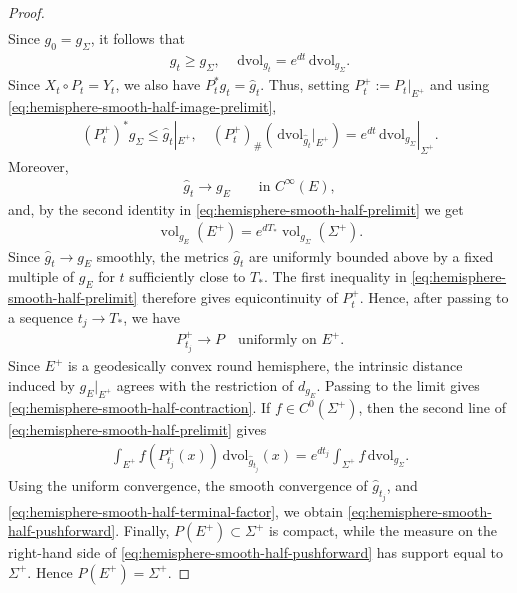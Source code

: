 \documentclass[11pt,reqno]{amsart}
\numberwithin{equation}{section}
\theoremstyle{definition}
\theoremstyle{remark}
\newcommand{\0}{\emptyset}
\newcommand{\vol}{\operatorname{vol}}
\newcommand{\dvol}{\,\mathrm{dvol}}
\begin{document}
\begin{proof}
\begin{align}
\end{align}
Since $g_0=g_\Sigma$, it follows that
\begin{align}\label{eq:hemisphere-smooth-metric-volume-consequences}
        g_t\geq g_\Sigma,
        \quad
        \dvol_{g_t}
        =
        e^{dt}\dvol_{g_\Sigma}.
\end{align}
Since $X_t\circ P_t=Y_t$, we also have $P_t^*g_t=\widehat g_t$. Thus, setting $P_t^+:=P_t|_{E^+}$ and using
\eqref{eq:hemisphere-smooth-half-image-prelimit},
\begin{align}\label{eq:hemisphere-smooth-half-prelimit}
        (P_t^+)^*g_\Sigma
        \leq
        \widehat g_t|_{E^+},
        \quad 
        (P_t^+)_\#\left(
        \dvol_{\widehat g_t}|_{E^+}
        \right)
        =
        e^{dt}\dvol_{g_\Sigma}|_{\Sigma^+}.
\end{align}
Moreover,
\begin{align}
        \widehat g_t
        \rightarrow
        g_E
        \qquad
        \text{in }C^\infty(E),
\end{align}
and, by the second identity in \eqref{eq:hemisphere-smooth-half-prelimit} we get
\begin{align}\label{eq:hemisphere-smooth-half-terminal-factor}
        \vol_{g_E}(E^+)
        =
        e^{dT_*}\vol_{g_\Sigma}(\Sigma^+).
\end{align}
Since $\widehat g_t\to g_E$ smoothly, the metrics $\widehat g_t$ are
uniformly bounded above by a fixed multiple of $g_E$ for $t$ sufficiently
close to $T_*$. The first inequality in
\eqref{eq:hemisphere-smooth-half-prelimit} therefore gives equicontinuity
of $P_t^+$. Hence, after passing to a sequence $t_j\to T_*$,
we have
\begin{align}
        P_{t_j}^+
        \rightarrow P
        \quad
        \text{uniformly on }E^+.
\end{align}
Since $E^+$ is a geodesically convex round hemisphere, the intrinsic
distance induced by $g_E|_{E^+}$ agrees with the restriction of
$d_{g_E}$. Passing to the limit gives \eqref{eq:hemisphere-smooth-half-contraction}. If
$f\in C^0(\Sigma^+)$, then the second line of
\eqref{eq:hemisphere-smooth-half-prelimit} gives
\begin{align}
        \int_{E^+}f(P_{t_j}^+(x))\dvol_{\widehat g_{t_j}}(x)
        =
        e^{dt_j}\int_{\Sigma^+}f\dvol_{g_\Sigma}.
\end{align}
Using the uniform convergence, the smooth convergence of $\widehat g_{t_j}$,
and \eqref{eq:hemisphere-smooth-half-terminal-factor}, we obtain
\eqref{eq:hemisphere-smooth-half-pushforward}. Finally,
$P(E^+)\subset\Sigma^+$ is compact, while the measure on the right-hand side
of \eqref{eq:hemisphere-smooth-half-pushforward} has support equal to
$\Sigma^+$. Hence $P(E^+)=\Sigma^+$.
\end{proof}
\end{document}
